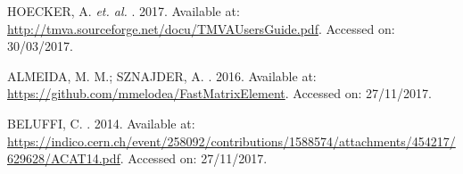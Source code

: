 \begin{thebibliography}{}
HOECKER, A.  \textit{et. al.}
.
2017.
Available at: \url{http://tmva.sourceforge.net/docu/TMVAUsersGuide.pdf}.
Accessed on: 30/03/2017.


ALMEIDA, M. M.; SZNAJDER, A.
. 
2016.
Available at: \url{https://github.com/mmelodea/FastMatrixElement}.
Accessed on: 27/11/2017.

BELUFFI, C. . 2014. Available at: \url{https://indico.cern.ch/event/258092/contributions/1588574/attachments/454217/629628/ACAT14.pdf}. Accessed on: 27/11/2017.

\end{thebibliography}
